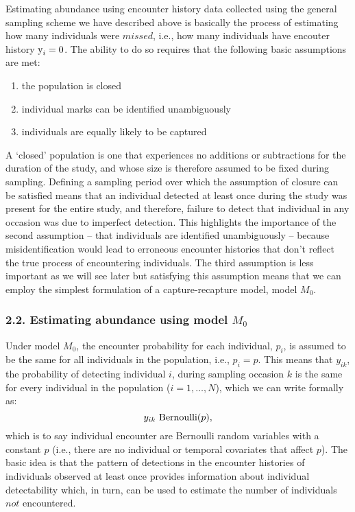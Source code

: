 \documentclass{book}
\begin{document}
Estimating abundance using encounter history data collected using the general sampling scheme we have described above is basically the process of estimating how many individuals were $missed$, i.e., how many individuals have encouter history $\hbox{y}_i = 0$. The ability to do so requires that the following basic assumptions are met:

\begin{enumerate}
\item the population is closed
\item individual marks can be identified unambiguously
\item individuals are equally likely to be captured
\end{enumerate}

A `closed' population is one that experiences no additions or subtractions for the duration of the study, and whose size is therefore assumed to be fixed during sampling. Defining a sampling period over which the assumption of closure can be satisfied means that an individual detected at least once during the study was present for the entire study, and therefore, failure to detect that individual in any occasion was due to imperfect detection. This highlights the importance of the second assumption -- that individuals are identified unambiguously -- because misidentification would lead to erroneous encounter histories that don't reflect the true process of encountering individuals. The third assumption is less important as we will see later but satisfying this assumption means that we can employ the simplest formulation of a capture-recapture model, model $M_0$.

\subsubsection*{2.2. Estimating abundance using model $M_0$}

Under model $M_0$, the encounter probability for each individual, $p_i$, is assumed to be the same for all individuals in the population, i.e., $p_i = p$. This means that $y_{ik}$, the probability of detecting individual $i$, during sampling occasion $k$ is the same for every individual in the population ($i = 1,\ldots,N$), which we can write formally as:
\[
y_{ik} ~ \hbox{Bernoulli}(p),
\]
which is to say individual encounter are Bernoulli random variables with a constant $p$ (i.e., there are no individual or temporal covariates that affect $p$). The basic idea is that the pattern of detections in the encounter histories of individuals observed at least once provides information about individual detectability which, in turn, can be used to estimate the number of individuals $not$ encountered.\\
\end{document}
